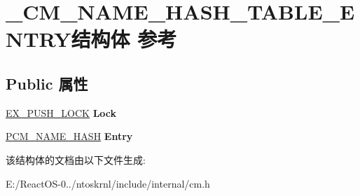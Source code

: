 \hypertarget{struct___c_m___n_a_m_e___h_a_s_h___t_a_b_l_e___e_n_t_r_y}{}\section{\+\_\+\+C\+M\+\_\+\+N\+A\+M\+E\+\_\+\+H\+A\+S\+H\+\_\+\+T\+A\+B\+L\+E\+\_\+\+E\+N\+T\+R\+Y结构体 参考}
\label{struct___c_m___n_a_m_e___h_a_s_h___t_a_b_l_e___e_n_t_r_y}
\subsection*{Public 属性}
\begin{DoxyCompactItemize}
\item 
\mbox{\label{struct___c_m___n_a_m_e___h_a_s_h___t_a_b_l_e___e_n_t_r_y_aa1d41d3c1f3fbf638f3301d7321f338e}} 
\hyperlink{struct___e_x___p_u_s_h___l_o_c_k}{E\+X\+\_\+\+P\+U\+S\+H\+\_\+\+L\+O\+CK} {\bfseries Lock}
\item 
\mbox{\label{struct___c_m___n_a_m_e___h_a_s_h___t_a_b_l_e___e_n_t_r_y_ad30eec1efe36235fe0aaf3b519b9af4b}} 
\hyperlink{struct___c_m___n_a_m_e___h_a_s_h}{P\+C\+M\+\_\+\+N\+A\+M\+E\+\_\+\+H\+A\+SH} {\bfseries Entry}
\end{DoxyCompactItemize}


该结构体的文档由以下文件生成\+:\begin{DoxyCompactItemize}
\item 
E\+:/\+React\+O\+S-\/0../ntoskrnl/include/internal/cm.\+h\end{DoxyCompactItemize}
